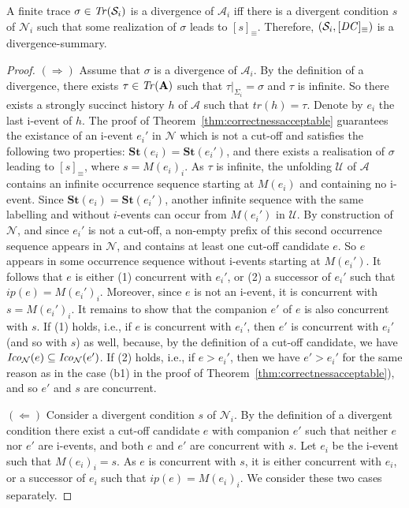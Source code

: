 \documentclass{llncs}
\def\A{\mathcal{A}}
\def\prod{\mathbf{A}}
\def\U{\mathcal{U}}
\def\N{\mathcal{N}}
\def\S{\mathcal{S}}
\newcommand{\st}[1]{\mathbf{St}(#1)}
\newcommand{\Tr}[1]{{\it Tr}(#1)}
\newcommand{\Coni}[2]{{\it Ico}_{#1}(#2)}
\renewcommand{\S}{{\cal S}}
\def\trace{tr}
\begin{document}
\begin{theorem}
\label{thm:divergences}
A finite trace $\sigma \in \Tr{\S_i}$ is a divergence of $\A_i$ 
if{}f there is a divergent condition $s$ of $\N_i$ such that some realization
of $\sigma$ leads to $[s]_\equiv$. Therefore, $(\S_i, [{\it DC}]_\equiv)$ is a divergence-summary.
\end{theorem}

\begin{proof}
$(\Rightarrow)$
Assume that $\sigma$ is a divergence of $\A_i$.
By the definition of a divergence, there exists $\tau\in\Tr{\prod}$ such that $\tau|_{\Sigma_i}=\sigma$ and $\tau$ is infinite.
So there exists a strongly succinct history $h$ of $\A$ such that $\trace(h)=\tau$. Denote by $e_i$ the last i-event of $h$.
The proof of Theorem~\ref{thm:correctnessacceptable} guarantees the existance
of an i-event $e_i'$ in $\N$ which is not a cut-off and satisfies the following two properties: $\st{e_i}=\st{e_i'}$, and there exists a realisation of $\sigma$ leading to $[s]_\equiv$, where $s=M(e_i)_i$.
As $\tau$ is infinite, the unfolding $\U$ of $\A$ contains an infinite occurrence sequence starting at $M(e_i)$ and containing no i-event. Since 
$\st{e_i}=\st{e_i'}$, another infinite sequence with the same labelling and without $i$-events can occur from $M(e_i')$ in $\U$. By construction of $\N$, and since $e_i'$ is not a cut-off, a non-empty prefix of this second occurrence sequence appears in $\N$, and contains at least one cut-off candidate $e$.
So $e$ appears in some occurrence sequence without i-events starting at $M(e_i')$.
It follows that $e$ is either (1) concurrent with $e_i'$, or 
(2) a successor of $e_i'$ such that $ip(e)=M(e_i')_i$. 
Moreover, since $e$ is not an i-event, it is concurrent with $s=M(e_i')_i$.
It remains to show that the companion $e'$ of $e$ is also concurrent with $s$.
If (1) holds, i.e., if $e$ is concurrent with $e_i'$, then $e'$ is concurrent with $e_i'$ (and so with $s$) as well, because, by the definition of a cut-off candidate, we have $\Coni{\N}{e}\subseteq\Coni{\N}{e'}$.
If (2) holds, i.e., if $e>e_i'$, then we have $e'>e_i'$ for the same reason as in the case (b1) in the proof of Theorem~\ref{thm:correctnessacceptable}), and so $e'$ and $s$ are concurrent.

$(\Leftarrow)$
Consider a divergent condition $s$ of $\N_i$.
By the definition of a divergent condition there exist a cut-off candidate $e$ with companion $e'$ such that neither $e$ nor $e'$ are i-events, 
and both $e$ and $e'$ are concurrent with $s$.
Let $e_i$ be the i-event such that $M(e_i)_i=s$.
As $e$ is concurrent with $s$, it is either concurrent with $e_i$, or a successor of $e_i$ such that $ip(e)=M(e_i)_i$. We consider these two cases separately.


\end{proof}
\end{document}
